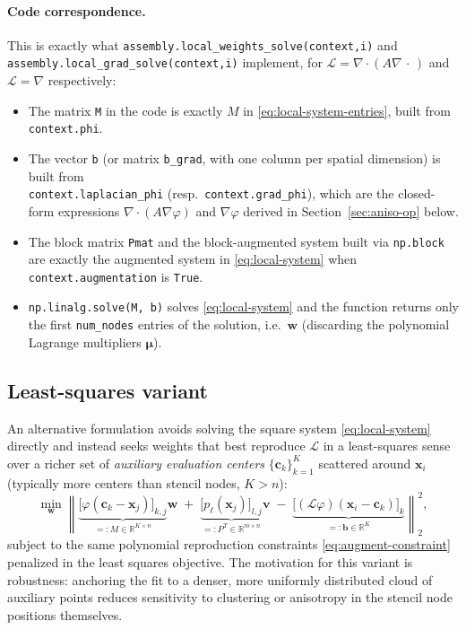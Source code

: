 \documentclass[11pt]{article}
\newcommand{\bx}{\mathbf{x}}
\newcommand{\bw}{\mathbf{w}}
\newcommand{\bc}{\mathbf{c}}
\newcommand{\R}{\mathbb{R}}
\newcommand{\diver}{\nabla\!\cdot}
\newcommand{\grad}{\nabla}
\begin{document}
\paragraph{Code correspondence.}
This is exactly what \texttt{assembly.local\_weights\_solve(context,i)}
and \texttt{assembly.local\_grad\_solve(context,i)} implement, for
$\mathcal{L} = \diver(A\grad\,\cdot\,)$ and $\mathcal{L} = \grad$
respectively:
\begin{itemize}[leftmargin=2em]
  \item The matrix \texttt{M} in the code is exactly $M$ in
        \eqref{eq:local-system-entries}, built from
        \texttt{context.phi}.
  \item The vector \texttt{b} (or matrix \texttt{b\_grad}, with one
        column per spatial dimension) is built from \\
        \texttt{context.laplacian\_phi} (resp.\ \texttt{context.grad\_phi}),
        which are the closed-form expressions $\diver(A\grad\varphi)$
        and $\grad\varphi$ derived in Section~\ref{sec:aniso-op} below.
  \item The block matrix \texttt{Pmat} and the block-augmented system
        built via \texttt{np.block} are exactly the augmented system
        in \eqref{eq:local-system} when \texttt{context.augmentation}
        is \texttt{True}.
  \item \texttt{np.linalg.solve(M, b)} solves \eqref{eq:local-system}
        and the function returns only the first \texttt{num\_nodes}
        entries of the solution, i.e.\ $\bw$ (discarding the
        polynomial Lagrange multipliers $\boldsymbol{\mu}$).
\end{itemize}

\subsection{Least-squares variant}
\label{sec:ls-variant}

An alternative formulation avoids solving the square system
\eqref{eq:local-system} directly and instead seeks weights that best
reproduce $\mathcal{L}$ in a least-squares sense over a richer set of
\emph{auxiliary evaluation centers} $\{\bc_k\}_{k=1}^{K}$ scattered
around $\bx_i$ (typically more centers than stencil nodes, $K > n$):
\begin{equation}
  \min_{\bw}
  \left\|
    \underbrace{\big[\varphi(\bc_k - \bx_j)\big]_{k,j}}_{=:M \in
    \R^{K\times n}} \mathbf{w}
    \;+\;
    \underbrace{\big[p_\ell(\bx_j)\big]_{l,j}}_{=:P^T \in
    \R^{m\times n}} \mathbf{v}
    \;-\;
    \underbrace{\big[(\mathcal{L}\varphi)(\bx_i - \bc_k)\big]_k}_{=:\mathbf{b}
    \in \R^{K}}
  \right\|_2^2,
  \label{eq:ls-system}
\end{equation}
subject to the same polynomial reproduction constraints
\eqref{eq:augment-constraint} penalized in the least squares objective. The motivation for this variant is robustness: anchoring
the fit to a denser, more uniformly distributed cloud of auxiliary
points reduces sensitivity to clustering or anisotropy in the stencil
node positions themselves.
\end{document}
